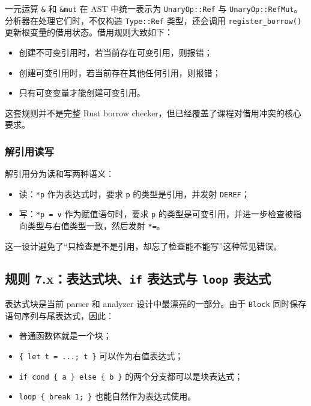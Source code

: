 \documentclass[UTF8,a4paper,12pt]{ctexart}
\newcommand{\pkg}[1]{\texttt{#1}}
\newcommand{\op}[1]{\texttt{#1}}
\begin{document}
一元运算 \pkg{\&} 和 \pkg{\&mut} 在 AST 中统一表示为 \pkg{UnaryOp::Ref} 与 \pkg{UnaryOp::RefMut}。分析器在处理它们时，不仅构造 \pkg{Type::Ref} 类型，还会调用 \pkg{register\_borrow()} 更新根变量的借用状态。借用规则大致如下：

\begin{itemize}
    \item 创建不可变引用时，若当前存在可变引用，则报错；
    \item 创建可变引用时，若当前存在其他任何引用，则报错；
    \item 只有可变变量才能创建可变引用。
\end{itemize}

这套规则并不是完整 Rust borrow checker，但已经覆盖了课程对借用冲突的核心要求。

\subsubsection{解引用读写}

解引用分为读和写两种语义：

\begin{itemize}
    \item 读：\pkg{*p} 作为表达式时，要求 \pkg{p} 的类型是引用，并发射 \op{DEREF}；
    \item 写：\pkg{*p = v} 作为赋值语句时，要求 \pkg{p} 的类型是可变引用，并进一步检查被指向类型与右值类型一致，然后发射 \op{*=}。
\end{itemize}

这一设计避免了“只检查是不是引用，却忘了检查能不能写”这种常见错误。

\subsection{规则 7.x：表达式块、\pkg{if} 表达式与 \pkg{loop} 表达式}

表达式块是当前 parser 和 analyzer 设计中最漂亮的一部分。由于 \pkg{Block} 同时保存语句序列与尾表达式，因此：

\begin{itemize}
    \item 普通函数体就是一个块；
    \item \pkg{\{ let t = ...; t \}} 可以作为右值表达式；
    \item \pkg{if cond \{ a \} else \{ b \}} 的两个分支都可以是块表达式；
    \item \pkg{loop \{ break 1; \}} 也能自然作为表达式使用。
\end{itemize}
\end{document}
